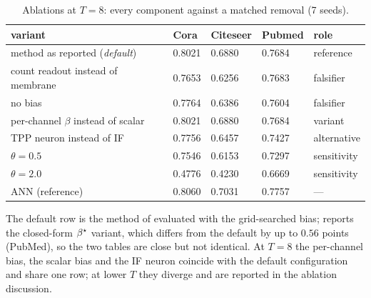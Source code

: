 \begin{table}[t]
\centering
\small
\caption{Ablations at $T=8$: every component against a matched removal (7 seeds).}
\label{tab:ablate}
\begin{tabular}{lllll}
\toprule
variant & Cora & Citeseer & Pubmed & role \\
\midrule
method as reported (\emph{default}) & 0.8021 & 0.6880 & 0.7684 & reference \\
count readout instead of membrane & 0.7653 & 0.6256 & 0.7683 & falsifier \\
no bias & 0.7764 & 0.6386 & 0.7604 & falsifier \\
per-channel $\beta$ instead of scalar & 0.8021 & 0.6880 & 0.7684 & variant \\
TPP neuron instead of IF & 0.7756 & 0.6457 & 0.7427 & alternative \\
$\theta = 0.5$ & 0.7546 & 0.6153 & 0.7297 & sensitivity \\
$\theta = 2.0$ & 0.4776 & 0.4230 & 0.6669 & sensitivity \\
ANN (reference) & 0.8060 & 0.7031 & 0.7757 & --- \\
\bottomrule
\end{tabular}
\par\vspace{2pt}\footnotesize The default row is the method of  evaluated with the
grid-searched bias;  reports the closed-form $\beta^{\star}$ variant, which differs from the
default by up to $0.56$ points (PubMed), so the two tables are close but not identical. At $T=8$
the per-channel bias, the scalar bias and the IF neuron coincide with the default configuration and
share one row; at lower $T$ they diverge and are reported in the ablation discussion.
\end{table}
